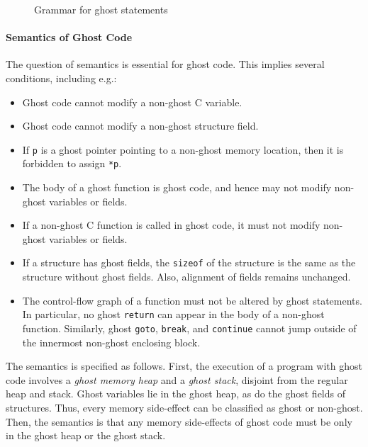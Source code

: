 \begin{figure}[t]
  \begin{cadre}
      
    \end{cadre}
  \caption{Grammar for ghost statements}
\label{fig:gram:ghost}
\end{figure}


\paragraph{Semantics of Ghost Code}
\label{sec:semantics-ghost-code}
The question of semantics is essential for ghost code.
 This implies several conditions, including e.g.:
\begin{itemize}
\item Ghost code cannot modify a non-ghost C variable.
\item Ghost code cannot modify a non-ghost structure field.
\item If \lstinline|p| is a ghost pointer pointing to a non-ghost
  memory location, then it is forbidden to assign \lstinline|*p|.
\item The body of a ghost function is ghost code, and hence may not modify
  non-ghost variables or fields.
\item If a non-ghost C function is called in ghost code, it must not
  modify non-ghost variables or fields.
\item If a structure has ghost fields, the \lstinline|sizeof| of the
  structure is the same as the structure without ghost fields. Also,
  alignment of fields remains unchanged.
\item The control-flow graph of a function must not be altered by
  ghost statements. In particular, no ghost \lstinline|return| can appear
  in the body of a non-ghost function. Similarly, ghost
  \lstinline|goto|, \lstinline|break|, and 
  \lstinline|continue| cannot jump
  outside of the innermost non-ghost enclosing block.
\end{itemize}

The semantics is specified as follows. First, the
execution of a program with ghost code involves a \emph{ghost memory heap}
and a \emph{ghost stack}, disjoint from the regular heap and stack.
Ghost variables lie in the ghost heap, as do the ghost fields of
structures. Thus, every memory side-effect can be classified as ghost
or non-ghost. Then, the semantics is that any memory side-effects of ghost
code must be only in the ghost heap or the ghost stack.

